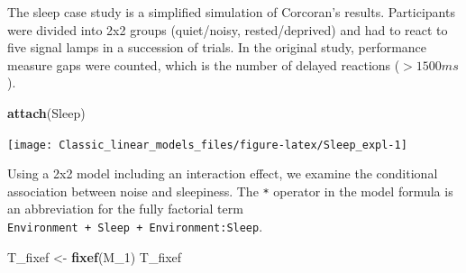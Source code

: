 \documentclass[]{svmono}
\newenvironment{Shaded}{\begin{snugshade}}{\end{snugshade}}
\newcommand{\KeywordTok}[1]{\textcolor[rgb]{0.13,0.29,0.53}{\textbf{#1}}}
\newcommand{\DataTypeTok}[1]{\textcolor[rgb]{0.13,0.29,0.53}{#1}}
\newcommand{\DecValTok}[1]{\textcolor[rgb]{0.00,0.00,0.81}{#1}}
\newcommand{\StringTok}[1]{\textcolor[rgb]{0.31,0.60,0.02}{#1}}
\newcommand{\OperatorTok}[1]{\textcolor[rgb]{0.81,0.36,0.00}{\textbf{#1}}}
\newcommand{\NormalTok}[1]{#1}
\begin{document}
The sleep case study is a simplified simulation of Corcoran's results.
Participants were divided into 2x2 groups (quiet/noisy, rested/deprived)
and had to react to five signal lamps in a succession of trials. In the
original study, performance measure gaps were counted, which is the
number of delayed reactions (\(>1500ms\)).

\begin{Shaded}
\begin{Highlighting}[]
\KeywordTok{attach}\NormalTok{(Sleep)}
\end{Highlighting}
\end{Shaded}

\begin{Shaded}
\end{Shaded}

\texttt{[image: Classic\_linear\_models\_files/figure-latex/Sleep\_expl-1]}

Using a 2x2 model including an interaction effect, we examine the
conditional association between noise and sleepiness. The \texttt{*}
operator in the model formula is an abbreviation for the fully factorial
term \texttt{Environment\ +\ Sleep\ +\ Environment:Sleep}.

\begin{Shaded}
\end{Shaded}

\begin{Shaded}
\begin{Highlighting}[]
\NormalTok{T_fixef <-}\StringTok{  }\KeywordTok{fixef}\NormalTok{(M_}\DecValTok{1}\NormalTok{)}
\NormalTok{T_fixef}
\end{Highlighting}
\end{Shaded}
\end{document}
